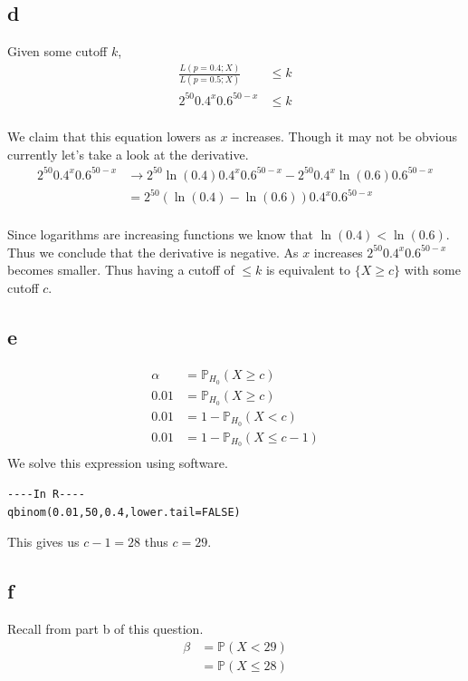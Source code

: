 \documentclass{article}
\newcommand{\prob}{\mathbb{P}}
\begin{document}
\subsection{d}
Given some cutoff $k$,
\begin{align*}
    \frac{L(p=0.4;X)}{L(p=0.5;X)} &\leq k \\
    2^{50} 0.4^x 0.6^{50-x} &\leq k \\
\end{align*}

We claim that this equation lowers as $x$ increases.
Though it may not be obvious currently let's take a look at the derivative.
\begin{align*}
    2^{50} 0.4^x 0.6^{50-x} 
    &\to 2^{50} \ln(0.4) 0.4^x 0.6^{50-x} - 2^{50} 0.4^x \ln(0.6) 0.6^{50-x} \\
    &= 2^{50} (\ln(0.4) - \ln(0.6)) 0.4^x 0.6^{50-x} \\
\end{align*}

Since logarithms are increasing functions we know that $\ln(0.4) < \ln(0.6)$.
Thus we conclude that the derivative is negative. As $x$ increases 
$2^{50} 0.4^x 0.6^{50-x}$ becomes smaller. Thus having a cutoff of $\leq k$ is
equivalent to $\{X \geq c\}$ with some cutoff $c$.

\subsection{e}
\begin{align*}
    \alpha &= \prob_{H_0}(X \geq c) \\
    0.01 &= \prob_{H_0}(X \geq c) \\
    0.01 &= 1 - \prob_{H_0}(X < c) \\
    0.01 &= 1 - \prob_{H_0}(X \leq c-1) \\
\end{align*}
We solve this expression using software.
\begin{verbatim}
----In R----
qbinom(0.01,50,0.4,lower.tail=FALSE)
\end{verbatim}
This gives us $c-1=28$ thus $c=29$.

\subsection{f}
Recall from part b of this question.
\begin{align*}
    \beta &= \prob(X < 29) \\
    &= \prob(X \leq 28) \\
\end{align*}
\end{document}
